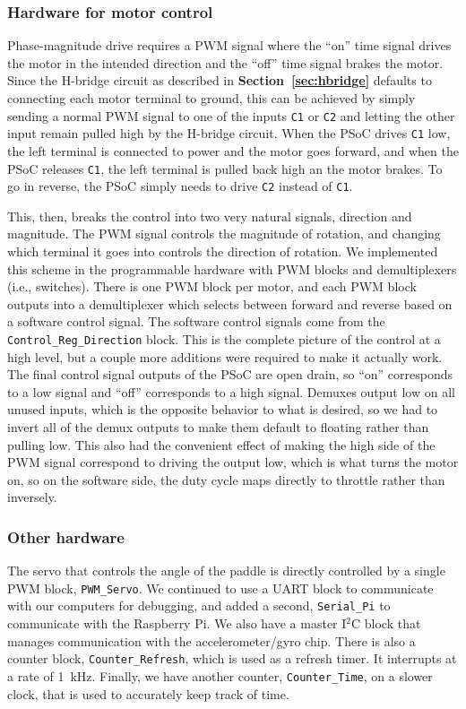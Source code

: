 \documentclass[letterpaper, 11pt]{article}
\newcommand*{\secref}[1]{\textbf{Section~\ref{#1}}}
\newcommand{\iic}{I$^2$C\xspace}
\begin{document}
\subsubsection{Hardware for motor control}
\label{sec:prog-hard-motor}
Phase-magnitude drive requires a PWM signal where the ``on'' time signal drives the motor in the intended direction and the ``off'' time signal brakes the motor. Since the H-bridge circuit as described in \secref{sec:hbridge} defaults to connecting each motor terminal to ground, this can be achieved by simply sending a normal PWM signal to one of the inputs \texttt{C1} or \texttt{C2} and letting the other input remain pulled high by the H-bridge circuit. When the PSoC drives \texttt{C1} low, the left terminal is connected to power and the motor goes forward, and when the PSoC releases \texttt{C1}, the left terminal is pulled back high an the motor brakes. To go in reverse, the PSoC simply needs to drive \texttt{C2} instead of \texttt{C1}.

This, then, breaks the control into two very natural signals, direction and magnitude. The PWM signal controls the magnitude of rotation, and changing which terminal it goes into controls the direction of rotation. We implemented this scheme in the programmable hardware with PWM blocks and demultiplexers (i.e., switches). There is one PWM block per motor, and each PWM block outputs into a demultiplexer which selects between forward and reverse based on a software control signal. The software control signals come from the \verb|Control_Reg_Direction| block. This is the complete picture of the control at a high level, but a couple more additions were required to make it actually work. The final control signal outputs of the PSoC are open drain, so ``on'' corresponds to a low signal and ``off'' corresponds to a high signal. Demuxes output low on all unused inputs, which is the opposite behavior to what is desired, so we had to invert all of the demux outputs to make them default to floating rather than pulling low. This also had the convenient effect of making the high side of the PWM signal correspond to driving the output low, which is what turns the motor on, so on the software side, the duty cycle maps directly to throttle rather than inversely.

\subsubsection{Other hardware}
The servo that controls the angle of the paddle is directly controlled by a single PWM block, \verb|PWM_Servo|. We continued to use a UART block to communicate with our computers for debugging, and added a second, \verb|Serial_Pi| to communicate with the Raspberry Pi. We also have a master \iic block that manages communication with the accelerometer/gyro chip. There is also a counter block, \verb|Counter_Refresh|, which is used as a refresh timer. It interrupts at a rate of \SI{1}{\kilo\hertz}. Finally, we have another counter, \verb|Counter_Time|, on a slower clock, that is used to accurately keep track of time.
\end{document}
